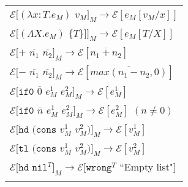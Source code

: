 \begin{figure}[ph!]
\centering
\begin{tabular}{l}
$\mathscr{E}[(\lambda x:T.e_{M})$ $v_{M}]_{M}\rightarrow\mathscr{E}[e_{M}[v_{M}/x]]$ \\

\vspace{5pt}

$\mathscr{E}[(\Lambda X.e_{M})$ $\lbrace T\rbrace]]_{M}\rightarrow\mathscr{E}[e_{M}[T/X]]$ \\

\vspace{5pt}

$\mathscr{E}[+$ $\overline{n_{1}}$ $\overline{n_{2}}]_{M}\rightarrow\mathscr{E}[\overline{n_{1}+n_{2}}]$ \\

\vspace{5pt}

$\mathscr{E}[-$ $\overline{n_{1}}$ $\overline{n_{2}}]_{M}\rightarrow\mathscr{E}[\overline{max(n_{1}-n_{2},0)}]$ \\

\vspace{5pt}

$\mathscr{E}[\mathtt{if0}$ $\overline{0}$ $e_{M}^{1}$ $e_{M}^{2}]_{M}\rightarrow\mathscr{E}[e_{M}^{1}]$ \\

\vspace{5pt}

$\mathscr{E}[\mathtt{if0}$ $\overline{n}$ $e_{M}^{1}$ $e_{M}^{2}]_{M}\rightarrow\mathscr{E}[e_{M}^{2}]$ $(n\neq0)$ \\

\vspace{5pt}

$\mathscr{E}[\mathtt{hd}$ $(\mathtt{cons}$ $v_{M}^{1}$ $v_{M}^{2})]_{M}\rightarrow\mathscr{E}[v_{M}^{1}]$ \\

\vspace{5pt}

$\mathscr{E}[\mathtt{tl}$ $(\mathtt{cons}$ $v_{M}^{1}$ $v_{M}^{2})]_{M}\rightarrow\mathscr{E}[v_{M}^{2}]$ \\

\vspace{5pt}

$\mathscr{E}[\mathtt{hd}$ $\mathtt{nil}^{T}]_{M}\rightarrow\mathscr{E}[\mathtt{wrong}^{T}$ ``Empty list"$]$ \\

\vspace{5pt}


\end{tabular}
\end{figure}

